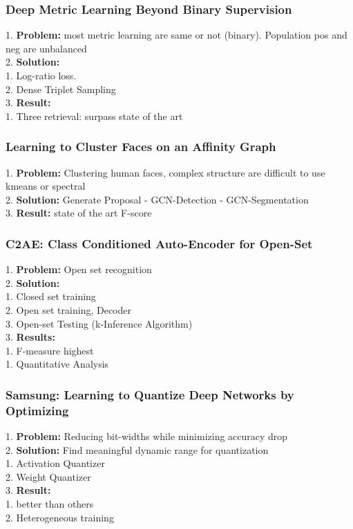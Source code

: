 \subsubsection{Deep Metric Learning Beyond Binary Supervision}
    1. {\bf Problem:} most metric learning are same or not (binary). Population pos and neg are unbalanced \\
    2. {\bf Solution:}  \\
        1. Log-ratio loss. \\
        2. Dense Triplet Sampling \\
    3. {\bf Result:} \\
        1. Three retrieval: surpass state of the art \\
\subsubsection{Learning to Cluster Faces on an Affinity Graph}
    1. {\bf Problem:} Clustering human faces, complex structure are difficult to use kmeans or spectral \\
    2. {\bf Solution:} Generate Proposal - GCN-Detection - GCN-Segmentation \\
    3. {\bf Result:} state of the art F-score \\
\subsubsection{C2AE: Class Conditioned Auto-Encoder for Open-Set}
    1. {\bf Problem:} Open set recognition \\
    2. {\bf Solution:}  \\
        1. Closed set training \\
        2. Open set training, Decoder \\
        3. Open-set Testing (k-Inference Algorithm) \\
    3. {\bf Results:} \\
        1. F-measure highest \\
            1. Quantitative Analysis \\
\subsubsection{Samsung: Learning to Quantize Deep Networks by Optimizing}
    1. {\bf Problem:} Reducing bit-widths while minimizing accuracy drop \\
    2. {\bf Solution:} Find meaningful dynamic range for quantization \\
        1. Activation Quantizer \\
        2. Weight Quantizer \\
    3. {\bf Result:}  \\
        1. better than others \\
        2. Heterogeneous training \\

